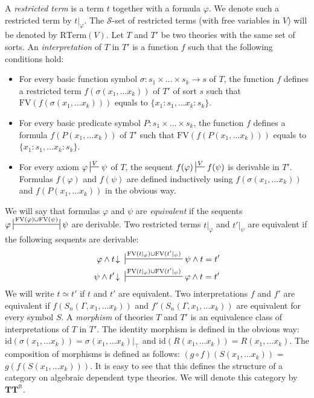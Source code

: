 \documentclass[reqno]{amsart}
\theoremstyle{definition}
\theoremstyle{remark}
\newcommand{\fs}[1]{\mathrm{#1}}
\newcommand{\RTerm}{\fs{RTerm}}
\newcommand{\FV}{\fs{FV}}
\newcommand{\ft}{\fs{ft}}
\newcommand{\id}{\fs{id}}
\newcommand{\cat}[1]{\mathbf{#1}}
\newcommand{\algtt}{\cat{TT}}
\numberwithin{figure}{section}
\begin{document}
A \emph{restricted term} is a term $t$ together with a formula $\varphi$.
We denote such a restricted term by $t|_\varphi$.
The $\mathcal{S}$-set of restricted terms (with free variables in $V$) will be denoted by $\RTerm(V)$.
Let $T$ and $T'$ be two theories with the same set of sorts.
An \emph{interpretation} of $T$ in $T'$ is a function $f$ such that the following conditions hold:
\begin{itemize}
\item For every basic function symbol $\sigma : s_1 \times \ldots \times s_k \to s$ of $T$,
the function $f$ defines a restricted term $f(\sigma(x_1, \ldots x_k))$ of $T'$ of sort $s$ such that $\FV(f(\sigma(x_1, \ldots x_k)))$ equals to $\{ x_1 : s_1, \ldots x_k : s_k \}$.
\item For every basic predicate symbol $P : s_1 \times \ldots \times s_k$,
the function $f$ defines a formula $f(P(x_1, \ldots x_k))$ of $T'$ such that $\FV(f(P(x_1, \ldots x_k)))$ equals to $\{ x_1 : s_1, \ldots x_k : s_k \}$.
\item For every axiom $\varphi \sststile{}{V} \psi$ of $T$, the sequent $f(\varphi) \sststile{}{V} f(\psi)$ is derivable in $T'$.
Formulas $f(\varphi)$ and $f(\psi)$ are defined inductively using $f(\sigma(x_1, \ldots x_k))$ and $f(P(x_1, \ldots x_k))$ in the obvious way.
\end{itemize}

We will say that formulas $\varphi$ and $\psi$ are \emph{equivalent} if the sequents $\varphi \ssststile{}{\FV(\varphi) \cup \FV(\psi)} \psi$ are derivable.
Two restricted terms $t|_\varphi$ and $t'|_\psi$ are equivalent if the following sequents are derivable:
\begin{align*}
\varphi \land t\!\downarrow\ & \sststile{}{\FV(t|_\varphi) \cup \FV(t'|_\psi)} \psi \land t = t' \\
\psi \land t'\!\downarrow\ & \sststile{}{\FV(t|_\varphi) \cup \FV(t'|_\psi)} \varphi \land t = t'
\end{align*}
We will write $t \simeq t'$ if $t$ and $t'$ are equivalent.
Two interpretations $f$ and $f'$ are equivalent if $f(S_n(\Gamma, x_1, \ldots x_k))$ and $f'(S_n(\Gamma, x_1, \ldots x_k))$ are equivalent for every symbol $S$.
A \emph{morphism} of theories $T$ and $T'$ is an equivalence class of interpretations of $T$ in $T'$.
The identity morphism is defined in the obvious way: $\id(\sigma(x_1, \ldots x_k)) = \sigma(x_1, \ldots x_k)|_\top$ and $\id(R(x_1, \ldots x_k)) = R(x_1, \ldots x_k)$.
The composition of morphisms is defined as follows: $(g \circ f)(S(x_1, \ldots x_k))$ = $g(f(S(x_1, \ldots x_k)))$.
It is easy to see that this defines the structure of a category on algebraic dependent type theories.
We will denote this category by $\algtt^\ft$.
\end{document}
